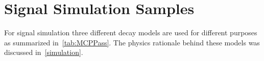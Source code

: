 






\section{Signal Simulation Samples}
\label{SimulationSamples}


For signal simulation three different decay models are used for different purposes as summarized in~\autoref{tab:MCPPass}. The physics rationale behind these models was discussed in~\autoref{simulation}.

